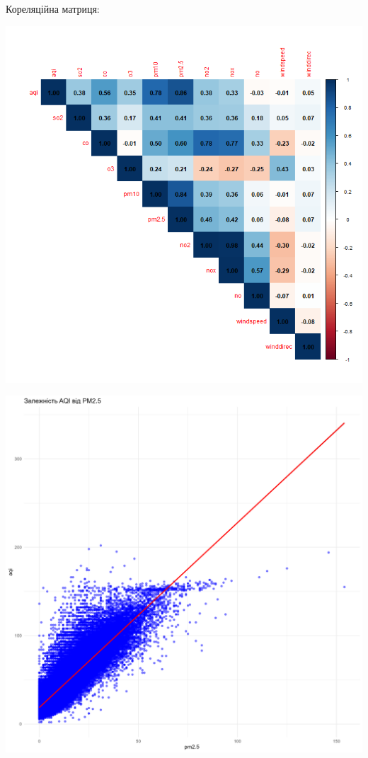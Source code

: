 \documentclass[./report.tex]{subfiles}
\begin{document}
\begin{enumerate}
    Кореляційна матриця:

    \includegraphics[width=6in]{plots/question1/corr_matrix_plot.png}

    \includegraphics[width=6in]{plots/question1/aqi_pm2_5_diagram.png}


\end{enumerate}
\end{document}
